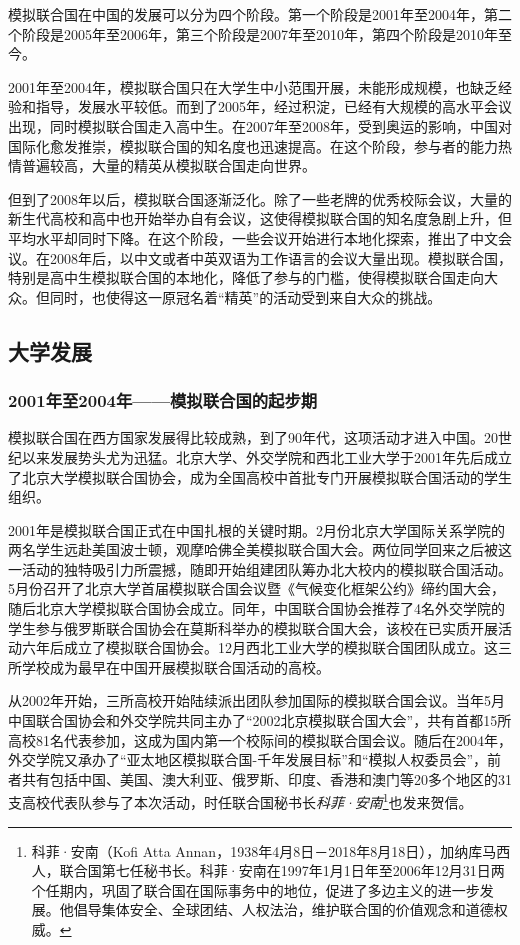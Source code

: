\documentclass[a4paper,openany]{book}
\begin{document}
模拟联合国在中国的发展可以分为四个阶段。第一个阶段是2001年至2004年，第二个阶段是2005年至2006年，第三个阶段是2007年至2010年，第四个阶段是2010年至今。

2001年至2004年，模拟联合国只在大学生中小范围开展，未能形成规模，也缺乏经验和指导，发展水平较低。而到了2005年，经过积淀，已经有大规模的高水平会议出现，同时模拟联合国走入高中生。在2007年至2008年，受到奥运的影响，中国对国际化愈发推崇，模拟联合国的知名度也迅速提高。在这个阶段，参与者的能力热情普遍较高，大量的精英从模拟联合国走向世界。

但到了2008年以后，模拟联合国逐渐泛化。除了一些老牌的优秀校际会议，大量的新生代高校和高中也开始举办自有会议，这使得模拟联合国的知名度急剧上升，但平均水平却同时下降。在这个阶段，一些会议开始进行本地化探索，推出了中文会议。在2008年后，以中文或者中英双语为工作语言的会议大量出现。模拟联合国，特别是高中生模拟联合国的本地化，降低了参与的门槛，使得模拟联合国走向大众。但同时，也使得这一原冠名着“精英”的活动受到来自大众的挑战。

\subsection{大学发展}

\subsubsection{2001年至2004年——模拟联合国的起步期}

模拟联合国在西方国家发展得比较成熟，到了90年代，这项活动才进入中国。20世纪以来发展势头尤为迅猛。北京大学、外交学院和西北工业大学于2001年先后成立了北京大学模拟联合国协会，成为全国高校中首批专门开展模拟联合国活动的学生组织。

2001年是模拟联合国正式在中国扎根的关键时期。2月份北京大学国际关系学院的两名学生远赴美国波士顿，观摩哈佛全美模拟联合国大会。两位同学回来之后被这一活动的独特吸引力所震撼，随即开始组建团队筹办北大校内的模拟联合国活动。5月份召开了北京大学首届模拟联合国会议暨《气候变化框架公约》缔约国大会，随后北京大学模拟联合国协会成立。同年，中国联合国协会推荐了4名外交学院的学生参与俄罗斯联合国协会在莫斯科举办的模拟联合国大会，该校在已实质开展活动六年后成立了模拟联合国协会。12月西北工业大学的模拟联合国团队成立。这三所学校成为最早在中国开展模拟联合国活动的高校。

从2002年开始，三所高校开始陆续派出团队参加国际的模拟联合国会议。当年5月中国联合国协会和外交学院共同主办了“2002北京模拟联合国大会”，共有首都15所高校81名代表参加，这成为国内第一个校际间的模拟联合国会议。随后在2004年，外交学院又承办了“亚太地区模拟联合国-千年发展目标”和“模拟人权委员会”，前者共有包括中国、美国、澳大利亚、俄罗斯、印度、香港和澳门等20多个地区的31支高校代表队参与了本次活动，时任联合国秘书长\textit{科菲·安南}\footnote{科菲·安南（Kofi Atta Annan，1938年4月8日－2018年8月18日），加纳库马西人，联合国第七任秘书长。科菲·安南在1997年1月1日年至2006年12月31日两个任期内，巩固了联合国在国际事务中的地位，促进了多边主义的进一步发展。他倡导集体安全、全球团结、人权法治，维护联合国的价值观念和道德权威。}也发来贺信。
\end{document}
